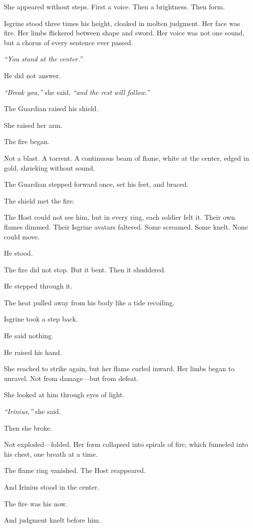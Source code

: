 \documentclass[12pt]{article}
\begin{document}
She appeared without steps. First a voice. Then a brightness. Then form.

Isgrine stood three times his height, cloaked in molten judgment. Her face was fire. Her limbs flickered between shape and sword. Her voice was not one sound, but a chorus of every sentence ever passed.

\textit{``You stand at the center.''}

He did not answer.

\textit{``Break you,''} she said, \textit{``and the rest will follow.''}

The Guardian raised his shield.

She raised her arm.

The fire began.

Not a blast. A torrent. A continuous beam of flame, white at the center, edged in gold, shrieking without sound.

The Guardian stepped forward once, set his feet, and braced.

The shield met the fire.

The Host could not see him, but in every ring, each soldier felt it. Their own flames dimmed. Their Isgrine avatars faltered. Some screamed. Some knelt. None could move.

He stood.

The fire did not stop. But it bent. Then it shuddered.

He stepped through it.

The heat pulled away from his body like a tide recoiling.

Isgrine took a step back.

He said nothing.

He raised his hand.

She reached to strike again, but her flame curled inward. Her limbs began to unravel. Not from damage—but from defeat.

She looked at him through eyes of light.

\textit{``Irinius,''} she said.

Then she broke.

Not exploded—folded. Her form collapsed into spirals of fire, which funneled into his chest, one breath at a time.

The flame ring vanished. The Host reappeared.

And Irinius stood in the center.

The fire was his now.

And judgment knelt before him.
\end{document}
